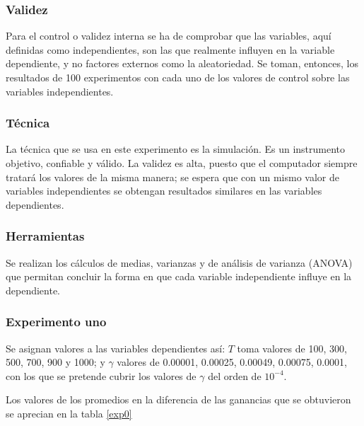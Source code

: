 \subsubsection{Validez}
Para el control o validez interna se ha de comprobar que las variables, aquí definidas como independientes, son las que realmente influyen en la variable dependiente, y no factores externos como la aleatoriedad. Se toman, entonces, los resultados de 100 experimentos con cada uno de los valores de control sobre las variables independientes.

\subsubsection{Técnica}
La técnica que se usa en este experimento es la simulación. Es un instrumento objetivo, confiable y válido. La validez es alta, puesto que el computador siempre tratará los valores de la misma manera; se espera que con un mismo valor de variables independientes se obtengan resultados similares en las variables dependientes.

\subsubsection{Herramientas}
Se realizan los cálculos de medias, varianzas y de análisis de varianza (ANOVA) que permitan concluir la forma en que cada variable independiente influye en la dependiente.

\subsubsection{Experimento uno}

Se asignan valores a las variables dependientes así: $T$ toma valores de 100, 300, 500, 700, 900 y 1000; y $\gamma$ valores de 0.00001, 0.00025, 0.00049, 0.00075, 0.0001, con los que se pretende cubrir los valores de $\gamma$ del orden de $10^{-4}$.

Los valores de los promedios en la diferencia de las ganancias que se obtuvieron se aprecian en la tabla \ref{exp0}

